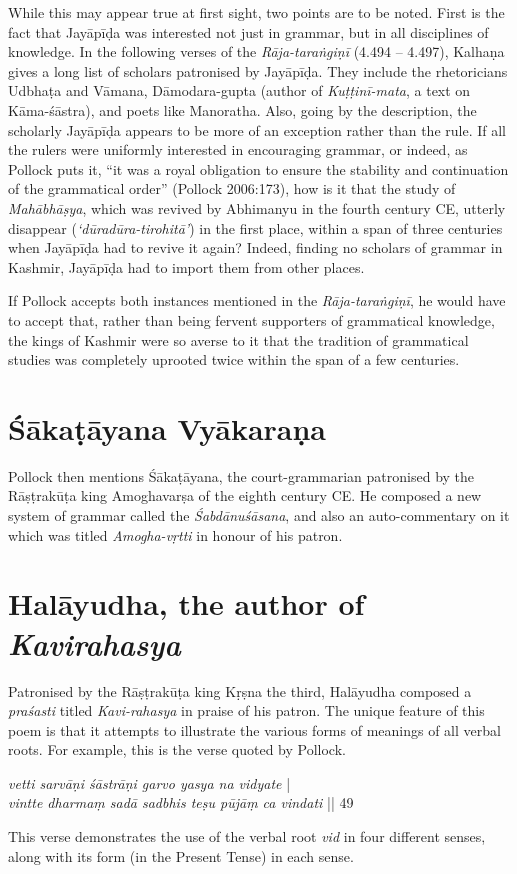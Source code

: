 While this may appear true at first sight, two points are to be noted. First is the fact that Jayāpīḍa was interested not just in grammar, but in all disciplines of knowledge. In the following verses of the {\sl Rāja-taraṅgiṇī} (4.494 -- 4.497), Kalhaṇa gives a long list of scholars patronised by Jayāpīḍa. They include the rhetoricians Udbhaṭa and Vāmana, Dāmodara-gupta (author of {\sl Kuṭṭinī-mata}, a text on Kāma-śāstra), and poets like Manoratha. Also, going by the description, the scholarly Jayāpīḍa appears to be more of an exception rather than the rule. If all the rulers were uniformly interested in encouraging grammar, or indeed, as Pollock puts it, ``it was a royal obligation to ensure the stability and continuation of the grammatical order'' (Pollock 2006:173), how is it that the study of {\sl Mahābhāṣya}, which was revived by Abhimanyu in the fourth century CE, utterly disappear ({\sl `dūradūra-tirohitā'}) in the first place, within a span of three centuries when Jayāpīḍa had to revive it again? Indeed, finding no scholars of grammar in Kashmir, Jayāpīḍa had to import them from other places. 

If Pollock accepts both instances mentioned in the {\sl Rāja-taraṅgiṇī}, he would have to accept that, rather than being fervent supporters of grammatical knowledge, the kings of Kashmir were so averse to it that the tradition of grammatical studies was completely uprooted twice within the span of a few centuries.

\section{Śākaṭāyana Vyākaraṇa}\label{chap3-sec13}

Pollock then mentions Śākaṭāyana,  the court-grammarian patronised by the Rāṣṭrakūṭa king Amoghavarṣa of the eighth century CE. He composed a new system of grammar called the {\sl Śabdānuśāsana}, and also an auto-commentary on it which was titled {\sl Amogha-vṛtti} in honour of his patron. 

\section{Halāyudha, the author of {\sl Kavirahasya}}\label{chap3-sec14}

Patronised by the Rāṣṭrakūṭa king Kṛṣna the third, Halāyudha composed a {\sl praśasti} titled {\sl Kavi-rahasya} in praise of his patron. The unique feature of this poem is that it attempts to illustrate the various forms of meanings of all verbal roots. For example, this is the verse quoted by Pollock. 
\begin{myquote}
{{\sl vetti sarvāṇi śāstrāṇi garvo yasya na vidyate}} |\\
{{\sl vintte dharmaṃ sadā sadbhis teṣu pūjāṃ ca vindati}} || 49 
\end{myquote}
This verse demonstrates the use of the verbal root {\sl vid} in four different senses, along with its form (in the Present Tense) in each sense.

